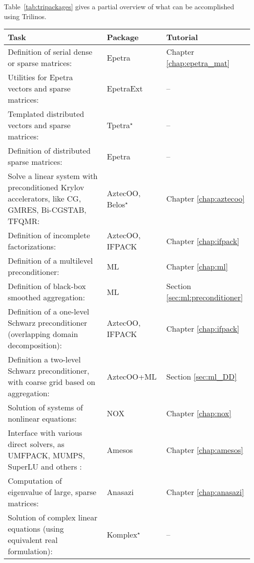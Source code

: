 Table~\ref{tab:tripackages} gives a partial overview of what can be
accomplished using Trilinos.
\begin{table}[htbp]
  \centering
  \begin{tabular}{| p{8cm} | p{2.5cm} | p{3cm} |}
    \hline
    {\bf Task} & {\bf Package} & {\bf Tutorial}\\
    \hline
    \hline
    Definition of serial dense or sparse matrices: & Epetra 
    & Chapter \ref{chap:epetra_mat} \\
    Utilities for Epetra vectors and sparse matrices: & EpetraExt & -- 
    \\
    \hline
    Templated distributed vectors and sparse matrices: & Tpetra$^\star$
    & -- \\
    \hline
    Definition of distributed sparse matrices:& Epetra & -- \\
    Solve a linear system with preconditioned Krylov accelerators, like
    CG, GMRES, Bi-CGSTAB, TFQMR:& AztecOO, Belos$^\star$ &
    Chapter \ref{chap:aztecoo} \\
    \hline
    Definition of incomplete factorizations:& AztecOO, \newline IFPACK &
    Chapter \ref{chap:ifpack} \\
    Definition of a multilevel preconditioner:& ML & Chapter
    \ref{chap:ml} \\
    \hline
    Definition of black-box smoothed aggregation:& ML & Section
    \ref{sec:ml:preconditioner} \\
    \hline
    Definition of a one-level Schwarz preconditioner (overlapping domain
    decomposition):& AztecOO, \newline IFPACK & Chapter \ref{chap:ifpack} \\
    Definition a two-level Schwarz preconditioner, with coarse grid based on
    aggregation:& AztecOO+ML & Section \ref{sec:ml_DD} \\
    \hline
    Solution of  systems of nonlinear equations:& NOX & Chapter \ref{chap:nox} \\
    Interface with various direct solvers, as UMFPACK, MUMPS, SuperLU
    and others :& Amesos & Chapter \ref{chap:amesos} \\
    \hline
    Computation of eigenvalue of large, sparse matrices:& Anasazi &
    Chapter \ref{chap:anasazi} 
    \\
    \hline
    Solution of complex linear equations (using equivalent real formulation):&
    Komplex$^\star$ & -- \\
    \hline

\end{tabular}
\end{table}
